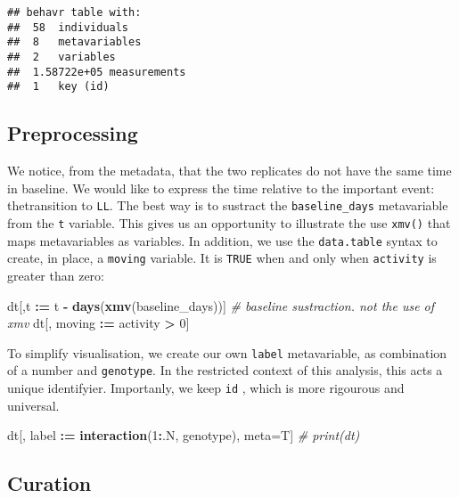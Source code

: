 \documentclass[]{article}
\newenvironment{Shaded}{\begin{snugshade}}{\end{snugshade}}
\newcommand{\CommentTok}[1]{\textcolor[rgb]{0.56,0.35,0.01}{\textit{#1}}}
\newcommand{\DecValTok}[1]{\textcolor[rgb]{0.00,0.00,0.81}{#1}}
\newcommand{\ErrorTok}[1]{\textcolor[rgb]{0.64,0.00,0.00}{\textbf{#1}}}
\newcommand{\KeywordTok}[1]{\textcolor[rgb]{0.13,0.29,0.53}{\textbf{#1}}}
\newcommand{\NormalTok}[1]{#1}
\newcommand{\OperatorTok}[1]{\textcolor[rgb]{0.81,0.36,0.00}{\textbf{#1}}}
\newcommand{\StringTok}[1]{\textcolor[rgb]{0.31,0.60,0.02}{#1}}
\begin{document}
\begin{verbatim}
## behavr table with:
##  58  individuals
##  8   metavariables
##  2   variables
##  1.58722e+05 measurements
##  1   key (id)
\end{verbatim}

\hypertarget{preprocessing}{%
\subsection{Preprocessing}\label{preprocessing}}

We notice, from the metadata, that the two replicates do not have the
same time in baseline. We would like to express the time relative to the
important event: thetransition to \texttt{LL}. The best way is to
sustract the \texttt{baseline\_days} metavariable from the \texttt{t}
variable. This gives us an opportunity to illustrate the use
\texttt{xmv()} that maps metavariables as variables. In addition, we use
the \texttt{data.table} syntax to create, in place, a \texttt{moving}
variable. It is \texttt{TRUE} when and only when \texttt{activity} is
greater than zero:

\begin{Shaded}
\begin{Highlighting}[]
\NormalTok{dt[,t }\OperatorTok{:}\ErrorTok{=}\StringTok{ }\NormalTok{t }\OperatorTok{-}\StringTok{ }\KeywordTok{days}\NormalTok{(}\KeywordTok{xmv}\NormalTok{(baseline_days))]    }\CommentTok{# baseline sustraction. not the use of xmv}
\NormalTok{dt[, moving }\OperatorTok{:}\ErrorTok{=}\StringTok{  }\NormalTok{activity }\OperatorTok{>}\StringTok{ }\DecValTok{0}\NormalTok{]  }
\end{Highlighting}
\end{Shaded}

To simplify visualisation, we create our own \texttt{label}
metavariable, as combination of a number and \texttt{genotype}. In the
restricted context of this analysis, this acts a unique identifyier.
Importanly, we keep \texttt{id} , which is more rigourous and universal.

\begin{Shaded}
\begin{Highlighting}[]
\NormalTok{dt[, label }\OperatorTok{:}\ErrorTok{=}\StringTok{ }\KeywordTok{interaction}\NormalTok{(}\DecValTok{1}\OperatorTok{:}\NormalTok{.N, genotype), meta=T]}
\CommentTok{# print(dt)}
\end{Highlighting}
\end{Shaded}

\hypertarget{curation}{%
\subsection{Curation}\label{curation}}
\end{document}
